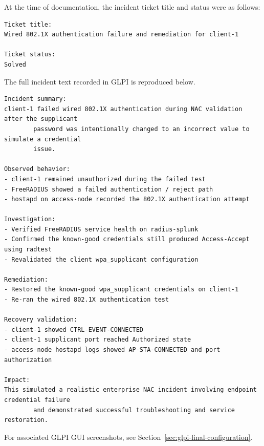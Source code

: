 \documentclass[11pt]{article}
\begin{document}
At the time of documentation, the incident ticket title and status were as follows:

\begin{verbatim}
Ticket title:
Wired 802.1X authentication failure and remediation for client-1

Ticket status:
Solved
\end{verbatim}

The full incident text recorded in GLPI is reproduced below.


\begin{verbatim}
Incident summary:
client-1 failed wired 802.1X authentication during NAC validation after the supplicant 
        password was intentionally changed to an incorrect value to simulate a credential
        issue.

Observed behavior:
- client-1 remained unauthorized during the failed test
- FreeRADIUS showed a failed authentication / reject path
- hostapd on access-node recorded the 802.1X authentication attempt

Investigation:
- Verified FreeRADIUS service health on radius-splunk
- Confirmed the known-good credentials still produced Access-Accept using radtest
- Revalidated the client wpa_supplicant configuration

Remediation:
- Restored the known-good wpa_supplicant credentials on client-1
- Re-ran the wired 802.1X authentication test

Recovery validation:
- client-1 showed CTRL-EVENT-CONNECTED
- client-1 supplicant port reached Authorized state
- access-node hostapd logs showed AP-STA-CONNECTED and port authorization

Impact:
This simulated a realistic enterprise NAC incident involving endpoint credential failure 
        and demonstrated successful troubleshooting and service restoration.
\end{verbatim}

For associated GLPI GUI screenshots, see Section~\ref{sec:glpi-final-configuration}.

\end{document}
